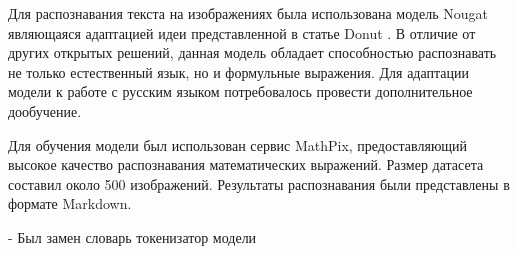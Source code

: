 
Для распознавания текста на изображениях была использована модель Nougat \cite{blecher2023nougat} являющаяся адаптацией идеи представленной в статье Donut \cite{kim2022ocr}.
 В отличие от других открытых решений, данная модель обладает способностью распознавать не только естественный язык, но и формульные выражения. Для адаптации модели к работе с русским языком потребовалось провести дополнительное дообучение.



Для обучения модели был использован сервис MathPix, предоставляющий высокое качество распознавания математических выражений. Размер датасета составил около 500 изображений. Результаты распознавания были представлены в формате Markdown.

- Был замен словарь токенизатор модели

